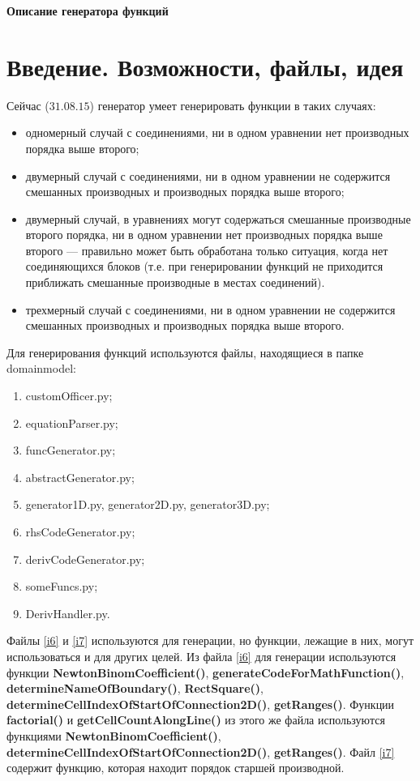 \documentclass[a4paper]{article}
\begin{document}
\begin{center}
{\Huge \bf Описание генератора функций}
\end{center}

\tableofcontents
\newpage

\large
\section*{\LARGE Введение. Возможности, файлы, идея}
Сейчас ($31.08.15$)  генератор умеет генерировать функции в таких случаях:
\begin{itemize}
\item одномерный случай с соединениями, ни в одном уравнении нет про\-из\-вод\-ных порядка выше второго;
\item двумерный случай с соединениями, ни в одном уравнении не со\-дер\-жит\-ся смешанных производных и производных порядка выше второго;
\item двумерный случай, в уравнениях могут содержаться смешанные про\-из\-вод\-ные второго порядка, ни в одном уравнении нет производных порядка выше второго --- правильно может быть обработана только ситуация, когда нет соединяющихся блоков (т.е. при генерировании функций не приходится приближать смешанные производные в мес\-тах соединений).
\item трехмерный случай с соединениями,  ни в одном уравнении не со\-дер\-жит\-ся смешанных производных и производных порядка выше второго.
\end{itemize}

Для генерирования функций используются файлы, находящиеся в пап\-ке domainmodel:
\begin{enumerate}
\item  customOfficer.py; \label{i1}
\item equationParser.py; \label{i2}
\item funcGenerator.py; \label{i3}
\item abstractGenerator.py; \label{i9}
\item generator1D.py, generator2D.py, generator3D.py; \label{i8}
\item  rhsCodeGenerator.py; \label{i4}
\item derivCodeGenerator.py; \label{i5}
\item someFuncs.py; \label{i6}
\item DerivHandler.py. \label{i7}
\end{enumerate}

Файлы \ref{i6} и \ref{i7} используются для генерации, но функции, лежащие в них, могут использоваться и для других целей. Из файла \ref{i6} для генерации используются функции {\bf NewtonBinomCoefficient()}, {\bf generateCodeForMathFunction()}, {\bf determineNameOfBoundary()}, {\bf RectSquare()}, {\bf determineCellIndexOfStartOfConnection2D()}, {\bf getRanges()}. Функции {\bf factorial()} и {\bf getCellCountAlongLine()} из этого же файла используются функциями {\bf NewtonBinomCoefficient()}, {\bf determineCellIndexOfStartOfConnection2D()}, {\bf getRanges()}. Файл \ref{i7} содержит функцию, которая находит порядок старшей про\-из\-вод\-ной.
\end{document}
